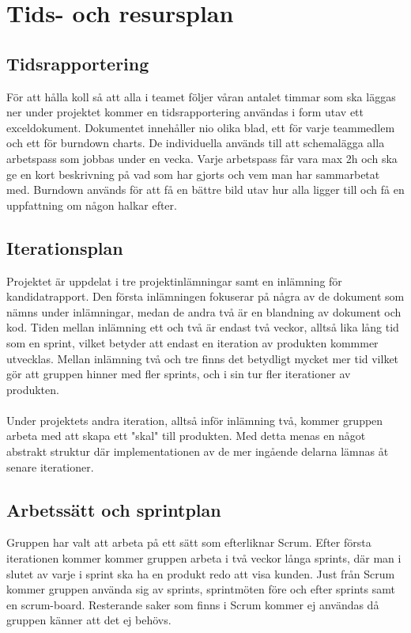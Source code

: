 \section{Tids- och resursplan}

\subsection{Tidsrapportering}
För att hålla koll så att alla i teamet följer våran antalet timmar som ska läggas ner under
projektet kommer en tidsrapportering\cite{bib-tidsrapportering} användas i form utav ett exceldokument. Dokumentet
innehåller nio olika blad, ett för varje teammedlem och ett för burndown charts.
De individuella används till att schemalägga alla arbetspass som jobbas under en vecka.
Varje arbetspass får vara max 2h och ska ge en kort beskrivning på vad som har gjorts och vem
man har sammarbetat med. Burndown används för att få en bättre bild utav hur alla ligger till
och få en uppfattning om någon halkar efter.


\subsection{Iterationsplan}
Projektet är uppdelat i tre projektinlämningar samt en inlämning för kandidatrapport. Den första inlämningen fokuserar på några av de dokument som nämns under inlämningar, medan de andra två är en blandning av dokument och kod. Tiden mellan inlämning ett och två är endast två veckor, alltså lika lång tid som en sprint, vilket betyder att endast en iteration av produkten kommmer utvecklas. Mellan inlämning två och tre finns det betydligt mycket mer tid vilket gör att gruppen hinner med fler sprints, och i sin tur fler iterationer av produkten.\\
\\
Under projektets andra iteration, alltså inför inlämning två, kommer gruppen arbeta med att skapa ett "skal" till produkten. Med detta menas en något abstrakt struktur där implementationen av de mer ingående delarna lämnas åt senare iterationer.

\subsection{Arbetssätt och sprintplan}
Gruppen har valt att arbeta på ett sätt som efterliknar Scrum. Efter första iterationen kommer kommer gruppen arbeta i två veckor långa sprints, där man i slutet av varje i sprint ska ha en produkt redo att visa kunden. Just från Scrum kommer gruppen använda sig av sprints, sprintmöten före och efter sprints samt en scrum-board. Resterande saker som finns i Scrum kommer ej användas då gruppen känner att det ej behövs.

